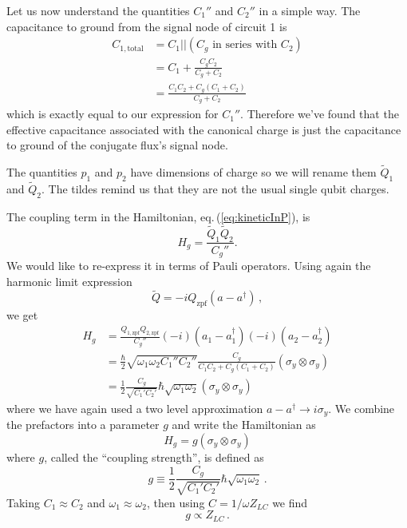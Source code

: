Let us now understand the quantities $C_1''$ and $C_2''$ in a simple way.
The capacitance to ground from the signal node of circuit 1 is
  \begin{align*}
  C_{1,\textrm{total}}
    &= C_1||(C_g \textrm{ in series with } C_2) \\
    &= C_1 + \frac{C_g C_2}{C_g+C_2} \\
    &= \frac{C_1 C_2 + C_g(C_1+C_2)}{C_g+C_2}
\end{align*}
which is exactly equal to our expression for $C_1''$.
Therefore we've found that the effective capacitance associated with the canonical charge is just the capacitance to ground of the conjugate flux's signal node.

The quantities $p_1$ and $p_2$ have dimensions of charge so we will rename them $\tilde{Q}_1$ and $\tilde{Q}_2$.
The tildes remind us that they are not the usual single qubit charges.

The coupling term in the Hamiltonian, eq.\,(\ref{eq:kineticInP}), is \begin{equation}
H_g = \frac{ \tilde{Q}_1 \tilde{Q}_2} {C_g''}. \label{eq:sec:coupling:H_g} \end{equation}
We would like to re-express it in terms of Pauli operators.
Using again the harmonic limit expression
\begin{equation}
  \tilde{Q} = -i Q_{\textrm{zpf}} (a - a^{\dagger}) \, ,
\end{equation}
we get
\begin{align*}
H_g
  &= \frac{Q_{1,\textrm{zpf}}Q_{2,\textrm{zpf}}}{C_g''}(-i)(a_1-a_1^{\dagger})(-i)(a_2-a_2^{\dagger}) \\
  &= \frac{\hbar}{2}\sqrt{\omega_1\omega_2 C_1'' C_2''}\frac{C_g}{C_1C_2 + C_g(C_1+C_2)}(\sigma_y \otimes \sigma_y) \\
  &= \frac{1}{2}\frac{C_g}{\sqrt{C_1' C_2'}} \hbar\sqrt{\omega_1\omega_2} (\sigma_y \otimes \sigma_y)
\end{align*}
where we have again used a two level approximation \mbox{$a - a^\dagger \rightarrow i \sigma_y$}.
We combine the prefactors into a parameter $g$ and write the Hamiltonian as \begin{equation}
H_g = g \left( \sigma_y \otimes \sigma_y \right) \end{equation}
where $g$, called the ``coupling strength'', is defined as \begin{equation}
g \equiv \frac{1}{2} \frac{C_g}{\sqrt{C_1' C_2'}} \hbar\sqrt{\omega_1\omega_2} \, . \end{equation}
Taking $C_1 \approx C_2$ and $\omega_1 \approx \omega_2$, then using $C = 1 / \omega Z_{LC}$ we find
\begin{equation}
g \propto Z_{LC} \, .
\end{equation}

